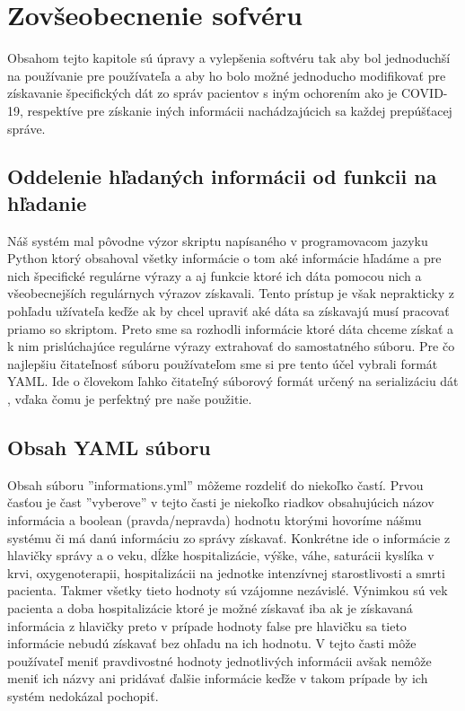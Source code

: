 \chapter{Zovšeobecnenie sofvéru}

Obsahom tejto kapitole sú úpravy a vylepšenia softvéru tak aby bol jednoduchší na používanie pre používateľa a aby ho bolo možné jednoducho modifikovať pre získavanie špecifických dát zo správ pacientov s iným ochorením ako je COVID-19, respektíve pre získanie iných informácii nachádzajúcich sa každej prepúšťacej správe.  

\section{Oddelenie hľadaných informácii od funkcii na hľadanie}

Náš systém mal pôvodne výzor skriptu napísaného v programovacom jazyku Python ktorý obsahoval všetky informácie o tom aké informácie hľadáme a pre nich špecifické regulárne výrazy a aj funkcie ktoré ich dáta pomocou nich a všeobecnejších regulárnych výrazov získavali. Tento prístup je však neprakticky z pohľadu užívateľa keďže ak by chcel upraviť aké dáta sa získavajú musí pracovať priamo so skriptom. Preto sme sa rozhodli informácie ktoré dáta chceme získať a k nim prislúchajúce regulárne výrazy extrahovať do samostatného súboru. Pre čo najlepšiu čitateľnosť súboru používateľom sme si pre tento účel vybrali formát YAML. Ide o človekom ľahko čitateľný súborový formát určený na serializáciu dát \cite{YAML}, vďaka čomu je perfektný pre naše použitie. 

\section{Obsah YAML súboru}
\label{obsahYAML}

Obsah súboru ''informations.yml'' môžeme rozdeliť do niekoľko častí. Prvou časťou je čast ''vyberove'' v tejto časti je niekoľko riadkov obsahujúcich názov informácia a boolean (pravda/nepravda) hodnotu ktorými hovoríme nášmu systému či má danú informáciu zo správy získavať. Konkrétne ide o informácie z hlavičky správy a o veku, dĺžke hospitalizácie, výške, váhe, saturácii kyslíka v krvi, oxygenoterapii, hospitalizácii na jednotke intenzívnej starostlivosti a smrti pacienta. Takmer všetky tieto hodnoty sú vzájomne nezávislé. Výnimkou sú vek pacienta a doba hospitalizácie ktoré je možné získavať iba ak je získavaná informácia z hlavičky preto v prípade hodnoty false pre hlavičku sa tieto informácie nebudú získavať bez ohľadu na ich hodnotu. V tejto časti môže používateľ meniť pravdivostné hodnoty jednotlivých informácii avšak nemôže meniť ich názvy ani pridávať ďalšie informácie keďže v takom prípade by ich systém nedokázal pochopiť.

